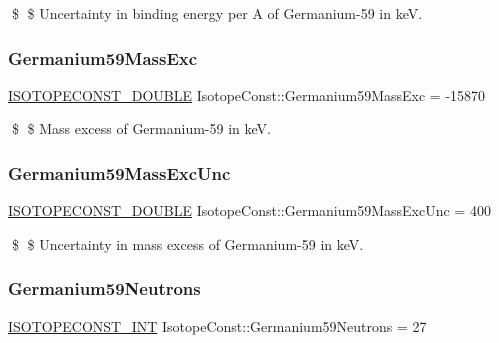 \$ \$ Uncertainty in binding energy per A of Germanium-\/59 in keV. \mbox{\label{group___isotope_const-_germanium-_ge59_ga77020e01345ca0ee6bdb4260b5787bd3}} 
\subsubsection{\texorpdfstring{Germanium59\+Mass\+Exc}{Germanium59MassExc}}
{\footnotesize\ttfamily \mbox{\hyperlink{group___isotope_const-_macros_ga8f45a7272ce02c0b4c65c44636ed719a}{I\+S\+O\+T\+O\+P\+E\+C\+O\+N\+S\+T\+\_\+\+D\+O\+U\+B\+LE}} Isotope\+Const\+::\+Germanium59\+Mass\+Exc = -\/15870}

\$ \$ Mass excess of Germanium-\/59 in keV. \mbox{\label{group___isotope_const-_germanium-_ge59_gaae2878bb380be497e98dccbfec50237e}} 
\subsubsection{\texorpdfstring{Germanium59\+Mass\+Exc\+Unc}{Germanium59MassExcUnc}}
{\footnotesize\ttfamily \mbox{\hyperlink{group___isotope_const-_macros_ga8f45a7272ce02c0b4c65c44636ed719a}{I\+S\+O\+T\+O\+P\+E\+C\+O\+N\+S\+T\+\_\+\+D\+O\+U\+B\+LE}} Isotope\+Const\+::\+Germanium59\+Mass\+Exc\+Unc = 400}

\$ \$ Uncertainty in mass excess of Germanium-\/59 in keV. \mbox{\label{group___isotope_const-_germanium-_ge59_gab9e57b990c6eb62ba924840c41efb544}} 
\subsubsection{\texorpdfstring{Germanium59\+Neutrons}{Germanium59Neutrons}}
{\footnotesize\ttfamily \mbox{\hyperlink{group___isotope_const-_macros_ga5f18360b3e99483a35c32d789e62621c}{I\+S\+O\+T\+O\+P\+E\+C\+O\+N\+S\+T\+\_\+\+I\+NT}} Isotope\+Const\+::\+Germanium59\+Neutrons = 27}

